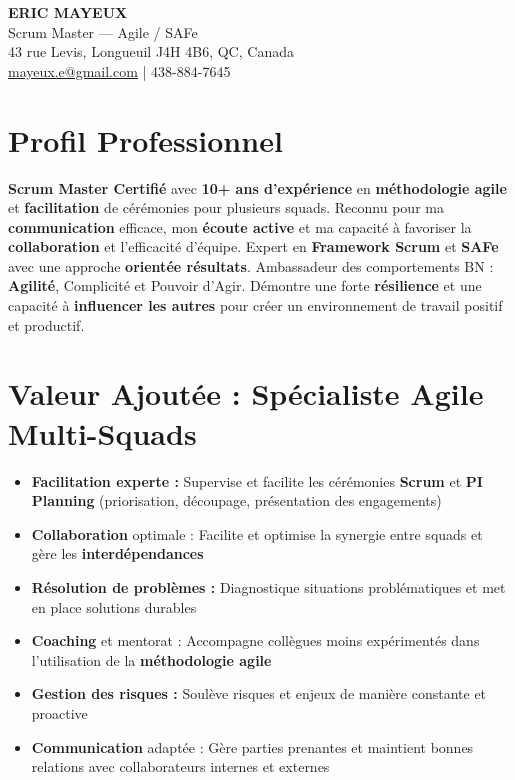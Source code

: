 \documentclass[11pt,a4paper]{article}
\newcommand{\highlight}[1]{\textcolor{primaryblue}{\textbf{#1}}}
\newcommand{\keypoint}[1]{\textbf{#1}}
\begin{document}
\begin{center}
    {\LARGE \textbf{ERIC MAYEUX}}\\
    \vspace{2pt}
    {\normalsize Scrum Master — Agile / SAFe}\\
    \vspace{3pt}
    43 rue Levis, Longueuil J4H 4B6, QC, Canada\\
    \href{mailto:mayeux.e@gmail.com}{mayeux.e@gmail.com} | 438-884-7645
\end{center}

\vspace{6pt}

\section*{Profil Professionnel}
\noindent
\highlight{Scrum Master Certifié} avec \keypoint{10+ ans d'expérience} en \highlight{méthodologie agile} et \highlight{facilitation} de cérémonies pour plusieurs squads. Reconnu pour ma \highlight{communication} efficace, mon \highlight{écoute active} et ma capacité à favoriser la \highlight{collaboration} et l'efficacité d'équipe. Expert en \highlight{Framework Scrum} et \highlight{SAFe} avec une approche \highlight{orientée résultats}. Ambassadeur des comportements BN : \highlight{Agilité}, Complicité et Pouvoir d'Agir. Démontre une forte \highlight{résilience} et une capacité à \highlight{influencer les autres} pour créer un environnement de travail positif et productif.

\section*{Valeur Ajoutée : Spécialiste Agile Multi-Squads}
\begin{itemize}[leftmargin=10pt]
    \item \highlight{Facilitation experte :} Supervise et facilite les cérémonies \highlight{Scrum} et \highlight{PI Planning} (priorisation, découpage, présentation des engagements)
    \item \highlight{Collaboration} optimale : Facilite et optimise la synergie entre squads et gère les \highlight{interdépendances}
    \item \highlight{Résolution de problèmes :} Diagnostique situations problématiques et met en place solutions durables
    \item \highlight{Coaching} et mentorat : Accompagne collègues moins expérimentés dans l'utilisation de la \highlight{méthodologie agile}
    \item \highlight{Gestion des risques :} Soulève risques et enjeux de manière constante et proactive
    \item \highlight{Communication} adaptée : Gère parties prenantes et maintient bonnes relations avec collaborateurs internes et externes
\end{itemize}
\end{document}
